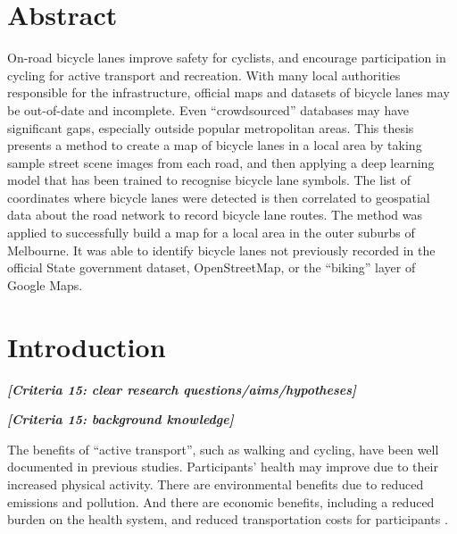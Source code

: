 \documentclass[11pt,twoside]{report}
\newcommand{\remark}[1]{{\bf \em [\marginpar{$\Leftarrow$}#1]}}
\begin{document}
\begingroup
\renewcommand{\cleardoublepage}{}
\renewcommand{\clearpage}{}
\chapter*{Abstract}
\endgroup

On-road bicycle lanes improve safety for cyclists, and encourage participation in cycling for active transport and recreation.  With many local authorities responsible for the infrastructure, official maps and datasets of bicycle lanes may be out-of-date and incomplete.  Even ``crowdsourced'' databases may have significant gaps, especially outside popular metropolitan areas.  This thesis presents a method to create a map of bicycle lanes in a local area by taking sample street scene images from each road,  and then applying a deep learning model that has been trained to recognise bicycle lane symbols.  The list of coordinates where bicycle  lanes were detected is then correlated to geospatial data about the road network to record bicycle lane routes.  The method was applied to successfully build a map for a local area in the outer suburbs of Melbourne.  It was able to identify bicycle lanes not previously recorded in the official State government dataset, OpenStreetMap, or the ``biking'' layer of Google Maps.


\tableofcontents
\listoffigures
\listoftables


\chapter{Introduction}

\remark{Criteria 15: clear research questions/aims/hypotheses}

\remark{Criteria 15: background knowledge}

The benefits of ``active transport'', such as walking and cycling, have been well documented in previous studies.  Participants' health may improve due to their increased physical activity.  There are environmental benefits due to reduced emissions and pollution.  And there are economic benefits, including a reduced burden on the health system, and reduced transportation costs for participants \cite{LEE2012219} \cite{RABL2012121}.
\end{document}

